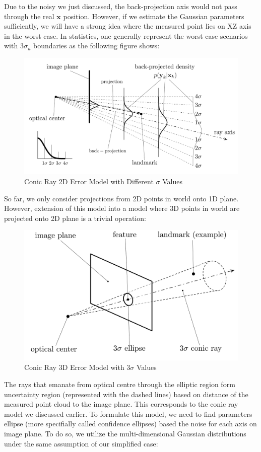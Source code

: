 \documentclass[a4paper]{report}
\numberwithin{figure}{section}
\begin{document}
Due to the noisy we just discussed, the back-projection axis would not pass 
through the real $\mathbf{x}$ position. However, if we estimate the Gaussian 
parameters sufficiently, we will have a strong idea where the measured
point lies on XZ axis in the worst case. In statistics, one generally represent the 
worst case scenarios with $3\sigma_u$ boundaries as the following figure shows:

\begin{figure}[H]
	\centering
  \includegraphics[width=0.7\linewidth,natwidth=640,natheight=640]
  {fig/ref_imgs/conic_ray_2d_model_stds.png}
  \caption{Conic Ray 2D Error Model with Different $\sigma$ Values}
	\label{fig:conic_ray_2d_error_model_stds}
\end{figure}

So far, we only consider projections from 2D points in world onto 1D plane. 
However, extension of this model into a model where 3D points in world are 
projected onto 2D plane is a trivial operation: 

\begin{figure}[H]
	\centering
  \includegraphics[width=0.7\linewidth,natwidth=640,natheight=640]
  {fig/ref_imgs/conic_ray_3d_model.png}
  \caption{Conic Ray 3D Error Model with $3\sigma$ Values}
	\label{fig:conic_ray_3d_error_model}
\end{figure}

The rays that emanate from optical centre through the elliptic region form 
uncertainty region (represented with the dashed lines) 
based on distance of the measured point cloud to the image plane. This 
corresponds to the conic ray model we discussed earlier. To formulate this model, we need to 
find parameters ellipse (more specifially called confidence ellipses) 
based the noise for each axis on image plane.
To do so, we utilize the multi-dimensional Gaussian distributions under the 
same assumption of our simplified case:
\end{document}
